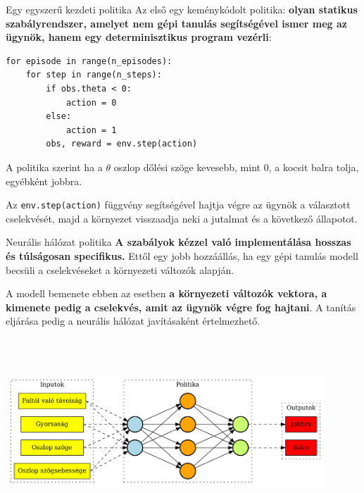 \documentclass[english, aspectratio=169]{beamer}
\begin{document}
\begin{frame}[fragile]{Egy egyszerű kezdeti politika}
Az első egy keménykódolt politika: \textbf{olyan statikus szabályrendszer, amelyet nem gépi tanulás segítségével ismer meg az ügynök, hanem egy determinisztikus program vezérli}:
\begin{small}
\begin{center}
\begin{lstlisting}
for episode in range(n_episodes):
	for step in range(n_steps):
		if obs.theta < 0:
			action = 0
		else:
			action = 1
		obs, reward = env.step(action)
\end{lstlisting}
\end{center}
\end{small}
A politika szerint ha a $\theta$ oszlop dőlési szöge kevesebb, mint $0$, a kocsit balra tolja, egyébként jobbra.\par\smallskip
Az \texttt{env.step(action)} függvény segítségével hajtja végre az ügynök a választott cselekvését, majd a környezet visszaadja neki a jutalmat és a következő állapotot. 
\end{frame}

\begin{frame}{Neurális hálózat politika}
\textbf{A szabályok kézzel való implementálása hosszas és túlságosan specifikus.} Ettől egy jobb hozzáállás, ha egy gépi tanulás modell becsüli a cselekvéseket a környezeti változók alapján.\par\smallskip
A modell bemenete ebben az esetben \textbf{a környezeti változók vektora, a kimenete pedig a cselekvés, amit az ügynök végre fog hajtani}. A tanítás eljárása pedig a neurális hálózat javításaként értelmezhető. 
\begin{center}
\includegraphics[width=12cm, height=7cm, keepaspectratio]{graphs/reinforcement_5.png}
\end{center}
\end{frame}
\end{document}
